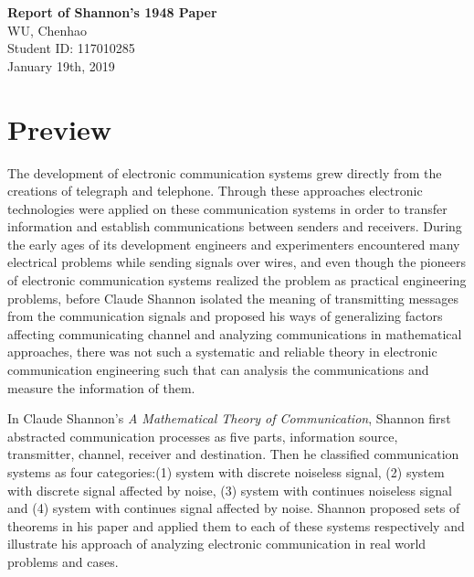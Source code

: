 \documentclass[12pt]{article}
\begin{document}
        \begin{titlepage}
                \begin{center}
                        \Large\textbf{Report of Shannon's 1948 Paper}\\
                        \Large\textmd{WU, Chenhao}\\
                        \Large\textmd{Student ID: 117010285}\\
                        \Large\textmd{January 19th, 2019}\\
                \end{center}
        \end{titlepage}

		\section{Preview}
		The development of electronic communication systems grew directly from the creations of telegraph and telephone. Through these approaches electronic technologies were applied on these communication systems in order to transfer information and establish communications between senders and receivers. During the early ages of its development engineers and experimenters encountered many electrical problems while sending signals over wires, and even though the pioneers of electronic communication systems realized the problem as practical engineering problems, before Claude Shannon isolated the meaning of transmitting messages from the communication signals and proposed his ways of generalizing factors affecting communicating channel and analyzing communications in mathematical approaches, there was not such a systematic and reliable theory in electronic communication engineering such that can analysis the communications and measure the information of them. \par
		In Claude Shannon's \textit{A Mathematical Theory of Communication}, Shannon first abstracted communication processes as five parts, information source, transmitter, channel, receiver and destination. Then he classified communication systems as four categories:(1) system with discrete noiseless signal, (2) system with discrete signal affected by noise, (3) system with continues noiseless signal and (4) system with continues signal affected by noise. Shannon proposed sets of theorems in his paper and applied them to each of these systems respectively and illustrate his approach of analyzing electronic communication in real world problems and cases.
		
\end{document}
